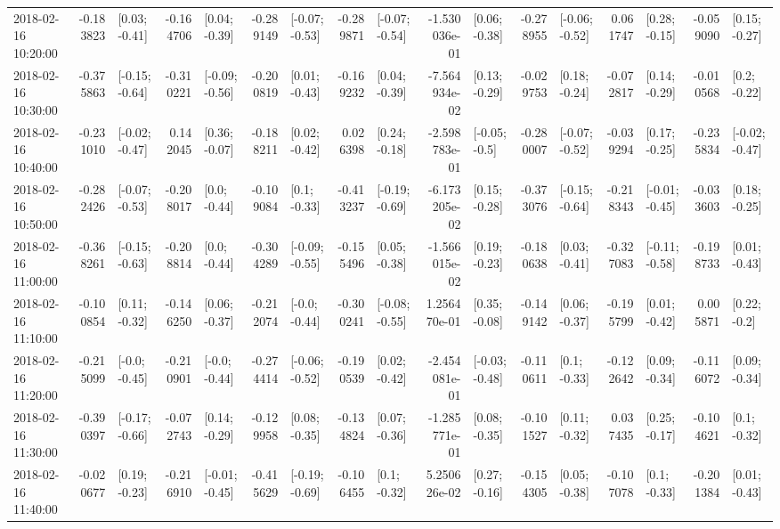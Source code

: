 \begin{tabular}{lrlrlrlrlrlrlrlrl}
2018-02-16 10:20:00 & -0.183823 &   [0.03; -0.41] & -0.164706 &   [0.04; -0.39] & -0.289149 &  [-0.07; -0.53] & -0.289871 &  [-0.07; -0.54] & -1.530036e-01 &   [0.06; -0.38] & -0.278955 &  [-0.06; -0.52] &  0.061747 &   [0.28; -0.15] & -0.059090 &   [0.15; -0.27] \\
2018-02-16 10:30:00 & -0.375863 &  [-0.15; -0.64] & -0.310221 &  [-0.09; -0.56] & -0.200819 &   [0.01; -0.43] & -0.169232 &   [0.04; -0.39] & -7.564934e-02 &   [0.13; -0.29] & -0.029753 &   [0.18; -0.24] & -0.072817 &   [0.14; -0.29] & -0.010568 &    [0.2; -0.22] \\
2018-02-16 10:40:00 & -0.231010 &  [-0.02; -0.47] &  0.142045 &   [0.36; -0.07] & -0.188211 &   [0.02; -0.42] &  0.026398 &   [0.24; -0.18] & -2.598783e-01 &   [-0.05; -0.5] & -0.280007 &  [-0.07; -0.52] & -0.039294 &   [0.17; -0.25] & -0.235834 &  [-0.02; -0.47] \\
2018-02-16 10:50:00 & -0.282426 &  [-0.07; -0.53] & -0.208017 &    [0.0; -0.44] & -0.109084 &    [0.1; -0.33] & -0.413237 &  [-0.19; -0.69] & -6.173205e-02 &   [0.15; -0.28] & -0.373076 &  [-0.15; -0.64] & -0.218343 &  [-0.01; -0.45] & -0.033603 &   [0.18; -0.25] \\
2018-02-16 11:00:00 & -0.368261 &  [-0.15; -0.63] & -0.208814 &    [0.0; -0.44] & -0.304289 &  [-0.09; -0.55] & -0.155496 &   [0.05; -0.38] & -1.566015e-02 &   [0.19; -0.23] & -0.180638 &   [0.03; -0.41] & -0.327083 &  [-0.11; -0.58] & -0.198733 &   [0.01; -0.43] \\
2018-02-16 11:10:00 & -0.100854 &   [0.11; -0.32] & -0.146250 &   [0.06; -0.37] & -0.212074 &   [-0.0; -0.44] & -0.300241 &  [-0.08; -0.55] &  1.256470e-01 &   [0.35; -0.08] & -0.149142 &   [0.06; -0.37] & -0.195799 &   [0.01; -0.42] &  0.005871 &    [0.22; -0.2] \\
2018-02-16 11:20:00 & -0.215099 &   [-0.0; -0.45] & -0.210901 &   [-0.0; -0.44] & -0.274414 &  [-0.06; -0.52] & -0.190539 &   [0.02; -0.42] & -2.454081e-01 &  [-0.03; -0.48] & -0.110611 &    [0.1; -0.33] & -0.122642 &   [0.09; -0.34] & -0.116072 &   [0.09; -0.34] \\
2018-02-16 11:30:00 & -0.390397 &  [-0.17; -0.66] & -0.072743 &   [0.14; -0.29] & -0.129958 &   [0.08; -0.35] & -0.134824 &   [0.07; -0.36] & -1.285771e-01 &   [0.08; -0.35] & -0.101527 &   [0.11; -0.32] &  0.037435 &   [0.25; -0.17] & -0.104621 &    [0.1; -0.32] \\
2018-02-16 11:40:00 & -0.020677 &   [0.19; -0.23] & -0.216910 &  [-0.01; -0.45] & -0.415629 &  [-0.19; -0.69] & -0.106455 &    [0.1; -0.32] &  5.250626e-02 &   [0.27; -0.16] & -0.154305 &   [0.05; -0.38] & -0.107078 &    [0.1; -0.33] & -0.201384 &   [0.01; -0.43] \\

\end{tabular}
